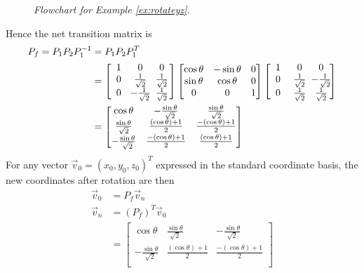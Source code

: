 \begin{solution}
\begin{figure}[ht!]
\caption{\textit{Flowchart for Example \ref{ex:rotateyz}.}}
\end{figure}
Hence the net transition matrix is
\begin{align*}
P_f = P_1 P_2 P_1^{-1} &= P_1 P_2 P_1^T \\
&= \left[\begin{array}{@{\,}wc{12pt}wc{12pt}wc{12pt}@{\,}}
1 & 0 & 0 \\
0 & \frac{1}{\sqrt{2}} & \frac{1}{\sqrt{2}} \\
0 & -\frac{1}{\sqrt{2}} & \frac{1}{\sqrt{2}}
\end{array}\right]
\begin{bmatrix}
\cos \theta & -\sin \theta & 0 \\
\sin \theta & \cos \theta & 0 \\
0 & 0 & 1
\end{bmatrix}
\left[\begin{array}{@{\,}wc{12pt}wc{12pt}wc{12pt}@{\;}}
1 & 0 & 0 \\
0 & \frac{1}{\sqrt{2}} & -\frac{1}{\sqrt{2}} \\
0 & \frac{1}{\sqrt{2}} & \frac{1}{\sqrt{2}}
\end{array}\right] \\
&= 
\begin{bmatrix}
\cos{\theta} & -\frac{\sin{\theta}}{\sqrt{2}} & \frac{\sin{\theta}}{\sqrt{2}} \\
\frac{\sin{\theta}}{\sqrt{2}} & \frac{(\cos{\theta}) + 1}{2} & \frac{-(\cos{\theta}) + 1}{2} \\
-\frac{\sin{\theta}}{\sqrt{2}} & \frac{-(\cos{\theta}) + 1}{2} & \frac{(\cos{\theta}) + 1}{2}
\end{bmatrix}
\end{align*}
For any vector $\vec{v}_0 = (x_0,y_0,z_0)^T$ expressed in the standard coordinate basis, the new coordinates after rotation are then
\begin{align*}
\vec{v}_0 &= P_f \vec{v}_n \\
\vec{v}_n &= (P_f)^T\vec{v}_0 \\
&=
\begin{bmatrix}
\cos{\theta} & \frac{\sin{\theta}}{\sqrt{2}} & -\frac{\sin{\theta}}{\sqrt{2}} \\
-\frac{\sin{\theta}}{\sqrt{2}} & \frac{(\cos{\theta}) + 1}{2} & \frac{-(\cos{\theta}) + 1}{2} \\

\end{bmatrix}
\end{align*}
\end{solution}
